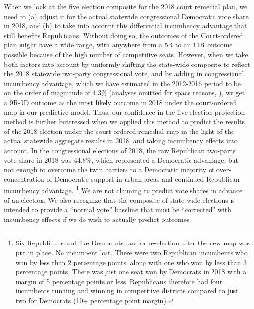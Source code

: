 \par
    When we look at the five election composite for the 2018 court remedial plan, we need to (a) adjust it for the actual statewide congressional Democratic vote share in 2018, and (b) to take into account this differential incumbency advantage that still benefits Republicans. Without doing so, the outcomes of the Court-ordered plan might have a wide range, with anywhere from a 5R to an 11R outcome possible because of the high number of competitive seats. However, when we take both factors into account by uniformly shifting the state-wide composite to reflect the 2018 statewide two-party congressional vote, and by adding in congressional incumbency advantage, which we have estimated in the 2012-2016 period to be on the order of magnitude of 4.3\% (analyses omitted for space reasons, \citet[see ][]{GelmenKing1990_inc_AJPS}), we get a 9R-9D outcome as the most likely outcome in 2018 under the court-ordered map in our predictive model. Thus, our confidence in the five election projection method is further buttressed when we applied this method to predict the results of the 2018 election under the court-ordered remedial map in the light of the actual statewide aggregate results in 2018, and taking incumbency effects into account. In the congressional elections of 2018, the raw Republican two-party vote share in 2018 was 44.8\%, which represented a Democratic advantage, but not enough to overcome the twin barriers to a Democratic majority of over-concentration of Democratic support in urban areas and continued Republican incumbency advantage.
        \footnote{Six Republicans and five Democrats ran for re-election after the new map was put in place. No incumbent lost. There were two Republican incumbents who won by less than 2 percentage points, along with one who won by less than 3 percentage points. There was just one seat won by Democrats in 2018 with a margin of 5 percentage points or less. Republicans therefore had four incumbents running and winning in competitive districts compared to just two for Democrats (10+ percentage point margin).}
    We are not claiming to predict vote shares in advance of an election. We also recognize that the composite of state-wide elections is intended to provide a ``normal vote'' baseline that must be ``corrected'' with incumbency effects if we do wish to actually predict outcomes.
